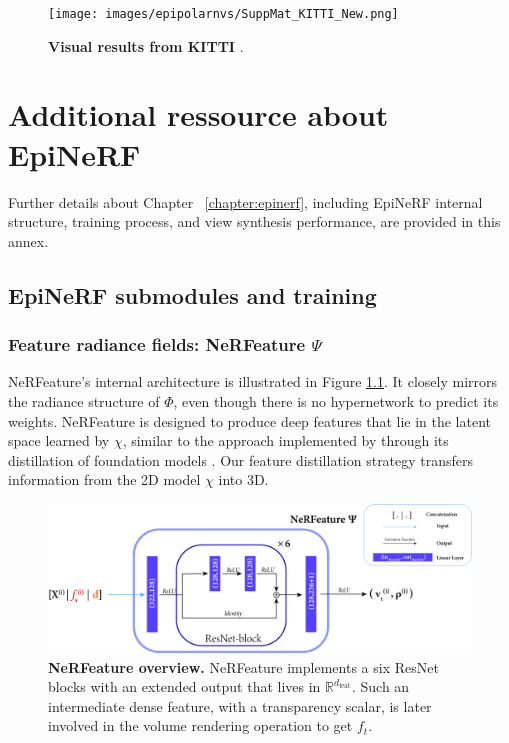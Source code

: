 \begin{figure}[htp!]
    \begin{center}
    \texttt{[image: images/epipolarnvs/SuppMat\_KITTI\_New.png]}
    \end{center}
     \caption{\textbf{Visual results from KITTI} \citep{geiger2012we}.}
     \label{fig:add_visKITTI}
\end{figure}


\chapter{Additional ressource about EpiNeRF}

Further details about Chapter ~\ref{chapter:epinerf}, including EpiNeRF internal structure, training process, and view synthesis performance, are provided in this annex. 

\section{EpiNeRF submodules and training}

\subsection{Feature radiance fields: NeRFeature $\Psi$}

NeRFeature's internal architecture is illustrated in Figure \ref{fig:supp_nerfeature}. It closely mirrors the radiance structure of $\Phi$, even though there is no hypernetwork to predict its weights. NeRFeature is designed to produce deep features that lie in the latent space learned by $\chi$, similar to the approach implemented by \cite{ye2023featurenerf} through its distillation of foundation models \cite{oquab2023dinov2}. Our feature distillation strategy transfers information from the 2D model $\chi$ into 3D.  
\begin{figure}[htp!]
    \begin{center}
  \includegraphics[width=\linewidth]{images/epinerf/supp_nerfeature.png}
  \caption{\textbf{NeRFeature overview.} NeRFeature implements a six ResNet blocks with an extended output that lives in $\mathbb{R}^{d_{\text{feat}}}$. Such an intermediate dense feature, with a transparency scalar, is later involved in the volume rendering operation to get $f_{t}$.}
  \label{fig:supp_nerfeature}
  \end{center}
\end{figure}


